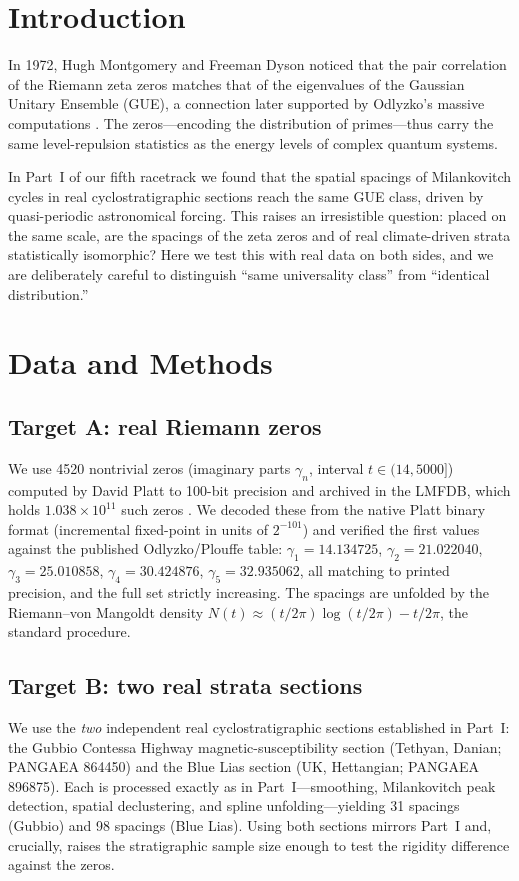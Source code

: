 \documentclass[12pt,a4paper]{article}
\begin{document}
\section{Introduction}

In 1972, Hugh Montgomery and Freeman Dyson noticed that the pair correlation of the Riemann zeta zeros matches that of the eigenvalues of the Gaussian Unitary Ensemble (GUE), a connection later supported by Odlyzko's massive computations \citep{montgomery1973,odlyzko1987}. The zeros---encoding the distribution of primes---thus carry the same level-repulsion statistics as the energy levels of complex quantum systems.

In Part~I of our fifth racetrack \citep{chen2026spatial} we found that the spatial spacings of Milankovitch cycles in real cyclostratigraphic sections reach the same GUE class, driven by quasi-periodic astronomical forcing. This raises an irresistible question: placed on the same scale, are the spacings of the zeta zeros and of real climate-driven strata statistically isomorphic? Here we test this with real data on both sides, and we are deliberately careful to distinguish ``same universality class'' from ``identical distribution.''

\section{Data and Methods}

\subsection{Target A: real Riemann zeros}
We use 4520 nontrivial zeros (imaginary parts $\gamma_n$, interval $t\in(14,5000]$) computed by David Platt to 100-bit precision and archived in the LMFDB, which holds $1.038\times10^{11}$ such zeros \citep{lmfdb,platt2021}. We decoded these from the native Platt binary format (incremental fixed-point in units of $2^{-101}$) and verified the first values against the published Odlyzko/Plouffe table: $\gamma_1=14.134725$, $\gamma_2=21.022040$, $\gamma_3=25.010858$, $\gamma_4=30.424876$, $\gamma_5=32.935062$, all matching to printed precision, and the full set strictly increasing. The spacings are unfolded by the Riemann--von Mangoldt density $N(t)\approx (t/2\pi)\log(t/2\pi)-t/2\pi$, the standard procedure.

\subsection{Target B: two real strata sections}
We use the \emph{two} independent real cyclostratigraphic sections established in Part~I: the Gubbio Contessa Highway magnetic-susceptibility section (Tethyan, Danian; PANGAEA 864450) and the Blue Lias section (UK, Hettangian; PANGAEA 896875). Each is processed exactly as in Part~I---smoothing, Milankovitch peak detection, spatial declustering, and spline unfolding---yielding 31 spacings (Gubbio) and 98 spacings (Blue Lias). Using both sections mirrors Part~I and, crucially, raises the stratigraphic sample size enough to test the rigidity difference against the zeros.
\end{document}
